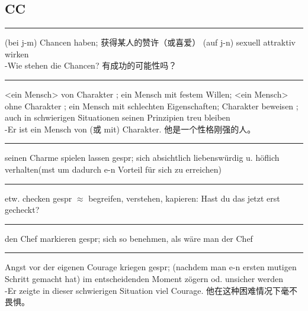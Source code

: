 \subsection{CC}
\label{app:dict:CC}
\noindent

\noindent\rule{\textwidth}{1pt}
(bei j-m) Chancen haben; 获得某人的赞许（或喜爱） (auf j-n) sexuell attraktiv wirken\\
-Wie stehen die Chancen?
有成功的可能性吗？


\noindent\rule{\textwidth}{1pt}
<ein Mensch> von Charakter ; ein Mensch mit festem Willen;
<ein Mensch> ohne Charakter ; ein Mensch mit schlechten Eigenschaften;
Charakter beweisen ; auch in schwierigen Situationen seinen Prinzipien treu bleiben\\
-Er ist ein Mensch von (或 mit) Charakter.
他是一个性格刚强的人。

\noindent\rule{\textwidth}{1pt}
seinen Charme spielen lassen gespr; sich absichtlich liebensw\"urdig u. h\"oflich verhalten(mst um dadurch e-n Vorteil f\"ur sich zu erreichen)

\noindent\rule{\textwidth}{1pt}
etw. checken gespr $\approx$ begreifen, verstehen, kapieren: Hast du das jetzt erst gecheckt?

\noindent\rule{\textwidth}{1pt}
den Chef markieren gespr; sich so benehmen, als w\"are man der Chef

\noindent\rule{\textwidth}{1pt}
Angst vor der eigenen Courage kriegen gespr; (nachdem man e-n ersten mutigen Schritt gemacht hat) im entscheidenden Moment z\"ogern od. unsicher werden\\
-Er zeigte in dieser schwierigen Situation viel Courage. 他在这种困难情况下毫不畏惧。




